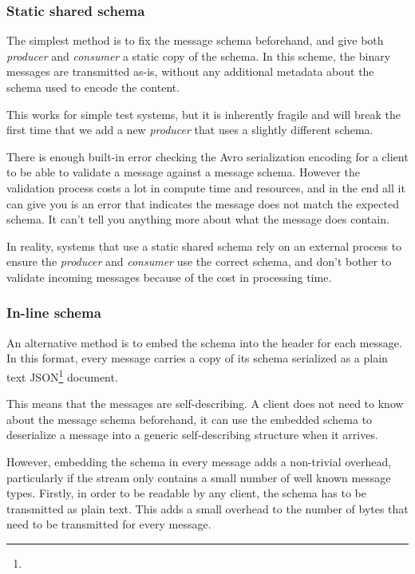 \documentclass{article}
\newcommand{\json} {JSON\xspace}
\newcommand{\avro} {Avro\xspace}
\newcommand{\kfconsumer} {\textit{consumer}\xspace}
\newcommand{\kfproducer} {\textit{producer}\xspace}
\newcommand{\deserz}    {deserialize\xspace}
\newcommand{\footurl}[1] {\footnote{\burl{#1}}}
\begin{document}
\subsubsection{Static shared schema}
\label{avro-static-schema}

The simplest method is to fix the message schema beforehand, and give both \kfproducer and \kfconsumer a static copy of the schema.  In this scheme, the binary messages are transmitted as-is, without any additional metadata about the schema used to encode the content.

This works for simple test systems, but it is inherently fragile and will break the first time that we add a new  \kfproducer that uses a slightly different schema.

There is enough built-in error checking the \avro serialization encoding for a client to be able to validate a message against a message schema. However the validation process costs a lot in compute time and resources, and in the end all it can give you is an error that indicates the message does not match the expected schema. It can't tell you anything more about what the message does contain.

In reality, systems that use a static shared schema rely on an external process to ensure the \kfproducer and \kfconsumer use the correct schema, and don't bother to validate incoming messages because of the cost in processing time.

\subsubsection{In-line schema}
\label{avro-inline-schema}

An alternative method is to embed the schema into the header for each message.
In this format, every message carries a copy of its schema serialized as a plain text \json\footurl{https://www.json.org/} document.

This means that the messages are self-describing. A client does not need to know about the message schema beforehand, it can use the embedded schema to \deserz a message into a generic self-describing structure when it arrives.

However, embedding the schema in every message adds a non-trivial overhead, particularly if the stream only contains a small number of well known message types.
Firstly, in order to be readable by any client, the schema has to be transmitted as plain text. This adds a small overhead to the number of bytes that need to be transmitted for every message.
\end{document}
